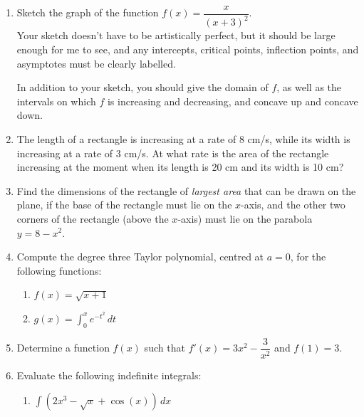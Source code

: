 \documentclass[12pt]{article}
\newcommand{\points}[1]{\marginpar{\hspace{24pt}[#1]}}
\newcommand{\di}{\displaystyle}
\begin{document}
\begin{enumerate}
\newpage

\item Sketch the graph of the function $f(x) = \dfrac{x}{(x+3)^2}$. \points{10} \\
Your sketch doesn't have to be artistically perfect, but it should be large enough for me to see, and any intercepts, critical points, inflection points, and asymptotes must be clearly labelled.

In addition to your sketch, you should give the domain of $f$, as well as the intervals on which $f$ is increasing and decreasing, and concave up and concave down.

\newpage

\item The length of a rectangle is increasing at a rate of 8 cm/s, while its width is increasing at a rate of 3 cm/s. At what rate is the area of the rectangle increasing at the moment when its length is 20 cm and its width is 10 cm? \points{5}

\vspace{3.75in}

\item Find the dimensions of the rectangle of \textit{largest area} that can be drawn on the plane, if the base of the rectangle must lie on the $x$-axis, and the other two corners of the rectangle (above the $x$-axis) must lie on the parabola $y=8-x^2$.\points{5}

\newpage

\item Compute the degree three Taylor polynomial, centred at $a=0$, for the following functions:
\begin{enumerate}
 \item $f(x) = \sqrt{x+1}$ \points{4}

\vspace{3in}

 \item $\di g(x) = \int_0^x e^{-t^2}\,dt$ \points{4}
\end{enumerate}


\vspace{3in}

\item Determine a function $f(x)$ such that $f'(x) = 3x^2-\dfrac{3}{x^2}$ and $f(1)=3$.\points{2}
 
\newpage

\item Evaluate the following indefinite integrals:
\begin{enumerate}
 \item $\di \int (2x^3-\sqrt{x}+\cos(x))\,dx$ \points{2}


\end{enumerate}
\end{enumerate}
\end{document}
